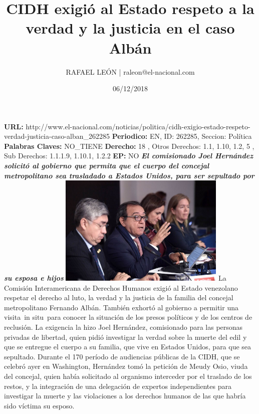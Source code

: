 \documentclass{article}%
\title{\textbf{CIDH exigió al Estado respeto a la verdad y la justicia en el caso Albán}}%
\author{RAFAEL LEÓN | raleon@el{-}nacional.com}%
\date{06/12/2018}%
\begin{document}
%
\normalsize%
\maketitle%
\textbf{URL: }%
http://www.el{-}nacional.com/noticias/politica/cidh{-}exigio{-}estado{-}respeto{-}verdad{-}justicia{-}caso{-}alban\_262285\newline%
%
\textbf{Periodico: }%
EN, %
ID: %
262285, %
Seccion: %
Política\newline%
%
\textbf{Palabras Claves: }%
NO\_TIENE\newline%
%
\textbf{Derecho: }%
18%
, Otros Derechos: %
1.1, 1.10, 1.2, 5%
, Sub Derechos: %
1.1.1.9, 1.10.1, 1.2.2%
\newline%
%
\textbf{EP: }%
NO\newline%
\newline%
%
\textbf{\textit{El comisionado Joel Hernández solicitó al gobierno que permita que el cuerpo del concejal metropolitano sea trasladado a Estados Unidos, para ser sepultado por su esposa e hijos}}%
\newline%
\newline%
%
\includegraphics[width=300px]{232.jpg}%
\newline%
%
La Comisión Interamericana de Derechos Humanos exigió al Estado venezolano respetar el derecho al luto, la verdad y la justicia de la familia del concejal metropolitano Fernando Albán. También exhortó al gobierno a permitir una visita~in situ~para conocer la situación de los presos políticos y de los centros de reclusión.%
\newline%
%
La exigencia la hizo Joel Hernández, comisionado para las personas privadas de libertad, quien pidió investigar la verdad sobre la muerte del edil y que se entregue el cuerpo a su familia, que vive en Estados Unidos, para que sea sepultado.%
\newline%
%
Durante el 170 período de audiencias públicas de la CIDH, que se celebró ayer en Washington, Hernández tomó la petición de Meudy Osio, viuda del concejal, quien había solicitado al organismo interceder por el traslado de los restos, y la integración de una delegación de expertos independientes para investigar la muerte y las violaciones a los derechos humanos de las que habría sido víctima su esposo.%
\end{document}
